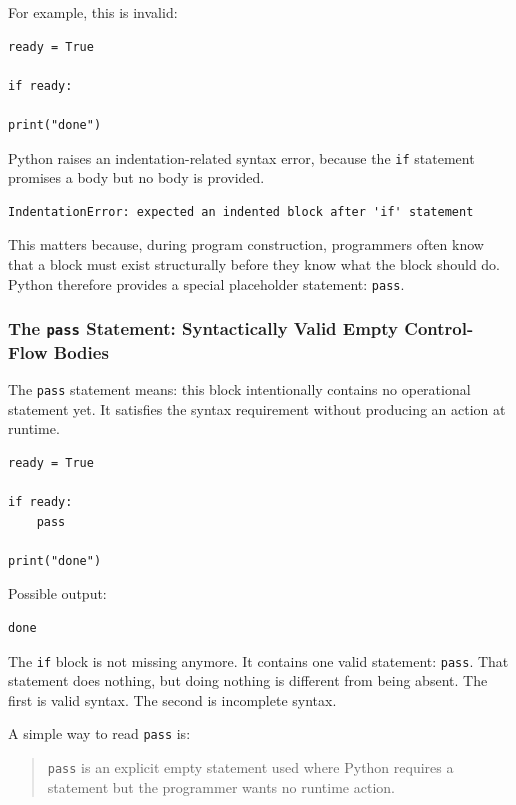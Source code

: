 \documentclass[a4paper,twoside]{report}
\begin{document}
For example, this is invalid:

\begin{verbatim}
ready = True

if ready:

print("done")
\end{verbatim}

Python raises an indentation-related syntax error, because the \texttt{if} statement promises a body but no body is provided.

\begin{verbatim}
IndentationError: expected an indented block after 'if' statement
\end{verbatim}

This matters because, during program construction, programmers often know that a block must exist structurally before they know what the block should do. Python therefore provides a special placeholder statement: \texttt{pass}.

\subsubsection{The \texttt{pass} Statement: Syntactically Valid Empty Control-Flow Bodies}

The \texttt{pass} statement means: this block intentionally contains no operational statement yet. It satisfies the syntax requirement without producing an action at runtime.

\begin{verbatim}
ready = True

if ready:
    pass

print("done")
\end{verbatim}

Possible output:

\begin{verbatim}
done
\end{verbatim}

The \texttt{if} block is not missing anymore. It contains one valid statement: \texttt{pass}. That statement does nothing, but doing nothing is different from being absent. The first is valid syntax. The second is incomplete syntax.

A simple way to read \texttt{pass} is:

\begin{quote}
\texttt{pass} is an explicit empty statement used where Python requires a statement but the programmer wants no runtime action.
\end{quote}
\end{document}

